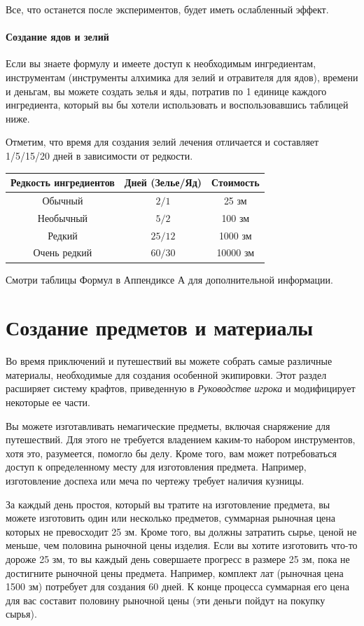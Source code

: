 \documentclass[a4paper, 9pt, twocolumn]{book}
\begin{document}
	Все, что останется после экспериментов, будет иметь ослабленный эффект.
	
	\subsubsection{Создание ядов и зелий}
	
	Если вы знаете формулу и имеете доступ к необходимым ингредиентам, инструментам (инструменты алхимика для зелий и отравителя для ядов), времени и деньгам, вы можете создать зелья и яды, потратив по 1 единице каждого ингредиента, который вы бы хотели использовать и воспользовавшись таблицей ниже.
	
	Отметим, что время для создания зелий лечения отличается и составляет 1/5/15/20 дней в зависимости от редкости.
	
	\begin{tabular}{|c|c|c|}
		\hline
		\textbf{Редкость ингредиентов} & \textbf{Дней (Зелье/Яд)} & \textbf{Стоимость} \\
		\hline
		Обычный & $2/1$ & 25 зм \\
		\hline
		Необычный & $5/2$ & 100 зм \\
		\hline
		Редкий & $25/12$ & 1000 зм \\
		\hline
		Очень редкий & $60/30$ & 10000 зм \\
		\hline
	\end{tabular}
	
	Смотри таблицы Формул в Аппендиксе А для дополнительной информации.
	
	\chapter{Создание предметов и материалы}
	
	Во время приключений и путешествий вы можете собрать самые различные материалы, необходимые для создания особенной экипировки. Этот раздел расширяет систему крафтов, приведенную в \textit{Руководстве игрока} и модифицирует некоторые ее части.
	
	Вы можете изготавливать немагические предметы, включая снаряжение для путешествий. Для этого не требуется владением каким-то набором инструментов, хотя это, разумеется, помогло бы делу. Кроме того, вам может потребоваться доступ к определенному месту для изготовления предмета. Например, изготовление доспеха или меча по чертежу требует наличия кузницы.
	
	За каждый день простоя, который вы тратите на изготовление предмета, вы можете изготовить один или несколько предметов, суммарная рыночная цена которых не превосходит 25 зм. Кроме того, вы должны затратить сырье, ценой не меньше, чем половина рыночной цены изделия. Если вы хотите изготовить что-то дороже 25 зм, то вы каждый день совершаете прогресс в размере 25 зм, пока не достигните рыночной цены предмета. Например, комплект лат (рыночная цена 1500 зм) потребует для создания 60 дней. К конце процесса суммарная его цена для вас составит половину рыночной цены (эти деньги пойдут на покупку сырья).
	
\end{document}
